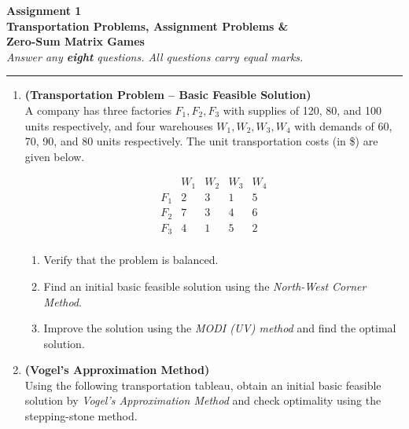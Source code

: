 \documentclass[12pt,a4paper]{article}
\begin{document}
\begin{center}
  {\LARGE \textbf{Assignment 1}}\\[4pt]
  {\large \textbf{Transportation Problems, Assignment Problems \&}}\\
  {\large \textbf{Zero-Sum Matrix Games}}\\[4pt]
  \textit{Answer any \textbf{eight} questions. All questions carry equal marks.}
\end{center}

\medskip\hrule\medskip

\begin{enumerate}[leftmargin=*, label=\textbf{Q.\arabic*.}]

\item \textbf{(Transportation Problem -- Basic Feasible Solution)}\\
  A company has three factories $F_1, F_2, F_3$ with supplies of 120, 80, and
  100 units respectively, and four warehouses $W_1, W_2, W_3, W_4$ with demands
  of 60, 70, 90, and 80 units respectively. The unit transportation costs (in
  \$) are given below.

  \[
    \begin{array}{c|cccc}
      & W_1 & W_2 & W_3 & W_4 \\\hline
      F_1 & 2   & 3   & 1   & 5   \\
      F_2 & 7   & 3   & 4   & 6   \\
      F_3 & 4   & 1   & 5   & 2   \\
    \end{array}
  \]

  \begin{enumerate}[label=(\alph*)]
    \item Verify that the problem is balanced.
    \item Find an initial basic feasible solution using the \textit{North-West
          Corner Method}.
    \item Improve the solution using the \textit{MODI (UV) method} and find
          the optimal solution.
  \end{enumerate}

\item \textbf{(Vogel's Approximation Method)}\\
  Using the following transportation tableau, obtain an initial basic feasible
  solution by \textit{Vogel's Approximation Method} and check optimality using
  the stepping-stone method.


\end{enumerate}
\end{document}
